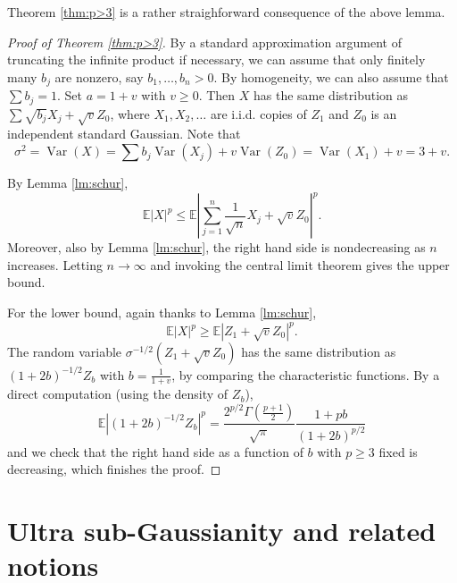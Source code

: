 \documentclass[10pt]{article}
\newcommand{\E}{\mathbb{E}}
\newcommand{\1}{\textbf{1}}
\DeclareMathOperator{\Var}{Var}
\theoremstyle{remark}
\theoremstyle{definition}
\begin{document}
Theorem \ref{thm:p>3} is a rather straighforward consequence of the above lemma.

\begin{proof}[Proof of Theorem \ref{thm:p>3}]
By a standard approximation argument of truncating the infinite product if necessary, we can assume that only finitely many $b_j$ are nonzero, say $b_1, \dots, b_n > 0$. By homogeneity, we can also assume that $\sum b_j = 1$. Set $a = 1 + v$ with $v \geq 0$. Then $X$ has the same distribution as $\sum \sqrt{b_j}X_j +  \sqrt{v}Z_0$, where $X_1, X_2, \dots$ are i.i.d. copies of $Z_1$ and $Z_0$ is an independent standard Gaussian. Note that
\[
\sigma^2 = \Var(X) = \sum b_j\Var(X_j) + v\Var(Z_0) = \Var(X_1) + v = 3 + v.
\]

By Lemma \ref{lm:schur},
\[
\E|X|^p \leq \E\left|\sum_{j=1}^n \frac{1}{\sqrt{n}}X_j + \sqrt{v}Z_0\right|^p.
\]
Moreover, also by Lemma \ref{lm:schur}, the right hand side is nondecreasing as $n$ increases. Letting $n \to \infty$ and invoking the central limit theorem gives the upper bound. 

For the lower bound, again thanks to Lemma \ref{lm:schur},
\[
\E|X|^p \geq \E|Z_1 + \sqrt{v}Z_0|^p.
\]
The random variable $\sigma^{-1/2}(Z_1+\sqrt{v}Z_0)$ has the same distribution as $(1+2b)^{-1/2}Z_b$ with $b = \frac{1}{1+v}$, by comparing the characteristic functions. By a direct computation (using the density of $Z_b$),
\[
\E|(1+2b)^{-1/2}Z_b|^p = \frac{2^{p/2}\Gamma\left(\frac{p+1}{2}\right)}{\sqrt{\pi}}\frac{1+pb}{(1+2b)^{p/2}}
\]
and we check that the right hand side as a function of $b$ with $p \geq 3$ fixed is decreasing, which finishes the proof.
\end{proof}





\section{Ultra sub-Gaussianity and related notions}\label{sec:notions}
\end{document}
